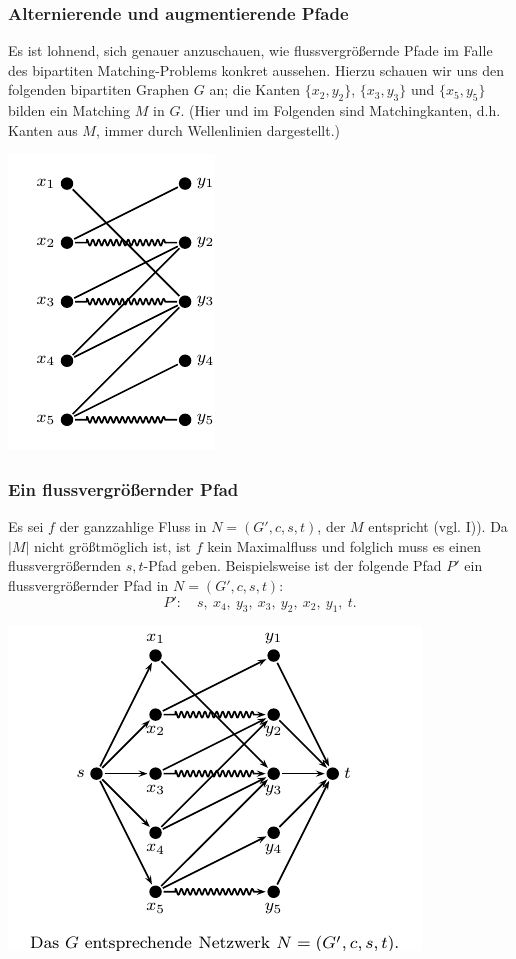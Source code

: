 \documentclass[smaller]{beamer}
\begin{document}
\begin{frame}
 \frametitle{Alternierende und augmentierende Pfade}
 \alert{Es ist lohnend, sich genauer anzuschauen, wie flussvergrößernde Pfade im Falle des bipartiten Matching-Problems konkret aussehen}. Hierzu schauen wir uns den folgenden bipartiten Graphen $G$ an; die Kanten $\bigl\{ x_2,y_2 \bigr\}$, $\bigl\{ x_3,y_3 \bigr\}$ und $\bigl\{ x_5,y_5 \bigr\}$ bilden ein Matching $M$ in $G$. (Hier und im Folgenden sind Matchingkanten, d.h. Kanten aus $M$, immer durch Wellenlinien dargestellt.)

\begin{center}
 \includegraphics{fig40.pdf}
\end{center}
\end{frame}

\begin{frame}
 \frametitle{Ein flussvergrößernder Pfad}
 Es sei $f$ der ganzzahlige Fluss in $N=(G',c,s,t)$, der $M$ entspricht (vgl. I)). Da $|M|$ nicht größtmöglich ist, ist $f$ kein Maximalfluss und folglich muss es einen flussvergrößernden $s,t$-Pfad geben. Beispielsweise ist der folgende Pfad $P'$ ein flussvergrößernder Pfad in $N=(G',c,s,t)$:
\[
P':\quad s,\ x_4,\ y_3,\ x_3,\ y_2,\ x_2,\ y_1,\ t.
\]

\begin{center}
 \includegraphics[scale=0.9]{fig41.pdf}
\end{center}
\end{frame}
\end{document}
